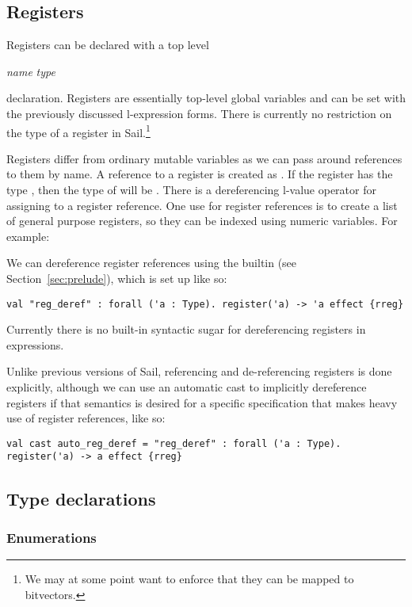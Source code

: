 \subsection{Registers}

Registers can be declared with a top level
\begin{center}
   \textit{name} \ll{:} \textit{type}
\end{center}
declaration. Registers are essentially top-level global variables and
can be set with the previously discussed l-expression forms. There is
currently no restriction on the type of a register in
Sail.\footnote{We may at some point want to enforce that they can be
  mapped to bitvectors.}

Registers differ from ordinary mutable variables as we can pass around
references to them by name. A reference to a register  is
created as . If the register  has the type ,
then the type of  will be . There is a
dereferencing l-value operator \ll{*} for assigning to a register
reference. One use for register references is to create a list of
general purpose registers, so they can be indexed using numeric
variables. For example:


We can dereference register references using the 
builtin (see Section~\ref{sec:prelude}), which is set up like so:
\begin{lstlisting}
val "reg_deref" : forall ('a : Type). register('a) -> 'a effect {rreg}
\end{lstlisting}
Currently there is no built-in syntactic sugar for dereferencing
registers in expressions.

Unlike previous versions of Sail, referencing and de-referencing
registers is done explicitly, although we can use an automatic cast to
implicitly dereference registers if that semantics is desired for a
specific specification that makes heavy use of register references,
like so:
\begin{lstlisting}
val cast auto_reg_deref = "reg_deref" : forall ('a : Type). register('a) -> a effect {rreg}
\end{lstlisting}


\subsection{Type declarations}

\subsubsection{Enumerations}

